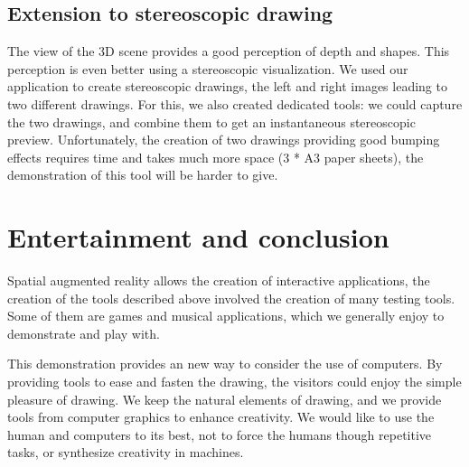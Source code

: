 \documentclass{article}
\begin{document}
\subsection{Extension to stereoscopic drawing} 
The view of the 3D scene provides a good perception of depth and shapes. This perception is even better using a stereoscopic visualization. We used our application to create stereoscopic drawings, the left and right images leading to two different drawings. For this, we also created dedicated tools: we could capture the two drawings, and combine them to get an instantaneous stereoscopic preview. Unfortunately, the creation of two drawings providing good bumping effects requires time and takes much more space (3 * A3 paper sheets), the demonstration of this tool will be harder to give.  

\section{Entertainment and conclusion}
Spatial augmented reality allows the creation of interactive applications, the creation of the tools described above involved the creation of many testing tools. Some of them are games and musical applications, which we generally enjoy to demonstrate and play with. 

This demonstration provides an new way to consider the use of computers. By providing tools to ease and fasten the drawing, the visitors could enjoy the simple pleasure of drawing. We keep the natural elements of drawing, and we provide tools from computer graphics to enhance creativity. We would like to use the human and computers to its best, not to force the humans though repetitive tasks, or synthesize creativity in machines. 




\end{document}
